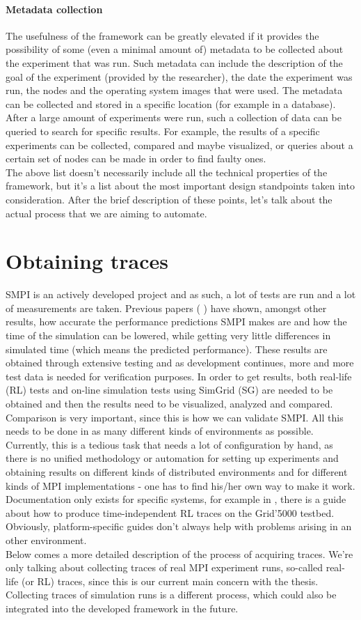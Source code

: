 \paragraph{Metadata collection}
The usefulness of the framework can be greatly elevated if it provides
the possibility of some (even a minimal amount of) metadata to be
collected about
the experiment that was run. Such metadata can include the description
of the goal of the experiment (provided by the researcher), the date
the experiment was run, the nodes and the operating system images that
were used. The metadata can be collected and stored in a specific
location (for example in a database). After a large amount of
experiments were run, such a collection of data can be queried to
search for specific results. For example, the results of a specific
experiments can be collected, compared and maybe visualized, or
queries about a certain set of nodes can be made in order to find
faulty ones.\\[0.3cm]
The above list doesn't necessarily include all the technical
properties of the framework, but it's a list about the most important
design standpoints taken into consideration. After the brief
description of these points, let's talk about the actual process that
we are aiming to automate.
\section{Obtaining traces}
SMPI is an actively developed project and as such, a lot of tests are
run and a lot of measurements are taken. Previous papers
(\cite{csgscq11} \cite{bdglmqssv13}) have shown, amongst other
results, how accurate the performance predictions SMPI makes are and
how the time of the simulation can be lowered, while getting very
little differences in simulated time (which means the predicted
performance). These results are obtained through extensive testing and
as development continues, more and more test data is needed for
verification purposes. In order to get results, both
real-life (RL) tests and on-line simulation tests using SimGrid (SG)
are needed to be obtained and then the results need to be visualized,
analyzed and compared. Comparison is very important, since this is how
we can validate SMPI. All this needs to be done in as many different
kinds of environments as possible. Currently, this is a tedious task
that needs a lot of configuration by hand, as there is no unified
methodology or automation for setting up experiments and obtaining
results on
different kinds of distributed environments and for different kinds of
MPI implementations - one has to find his/her own way to make it
work. Documentation only exists for specific systems, for example in
\cite{ms11}, there is a guide about how to produce time-independent RL
traces on the Grid'5000 testbed. Obviously, platform-specific guides
don't always help with problems arising in an other environment.\\[0.3cm]
Below comes a more detailed description of the process of acquiring
traces. We're only talking about collecting traces of real MPI
experiment runs, so-called real-life (or RL) traces, since this is our
current main concern with the thesis. Collecting traces of simulation
runs is a different process, which could also be integrated into the
developed framework in the future.
